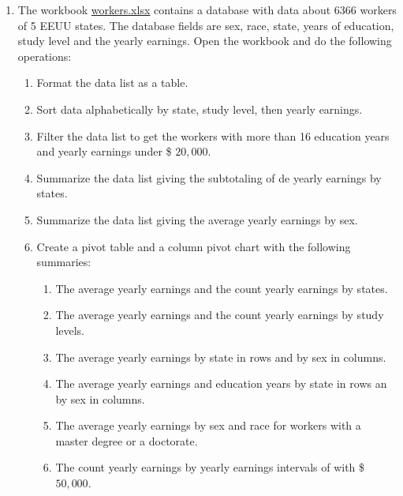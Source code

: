 \begin{enumerate}[leftmargin=*,resume]
\item The workbook
\href{http://aprendeconalf.es/office/excel/exercises/databases/workers.xlsx}{\textsf{workers.xlsx}}
contains a database with data about 6366 workers of 5 EEUU states.
The database fields are sex, race, state, years of education, study level and the yearly earnings.
Open the workbook and do the following operations:
\begin{enumerate}
\item Format the data list as a table.
\item Sort data alphabetically by state, study level, then yearly earnings.
\item Filter the data list to get the workers with more than 16 education years and yearly earnings under \$ $20,000$.   
\item Summarize the data list giving the subtotaling of de yearly earnings by states. 
\item Summarize the data list giving the average yearly earnings by sex. 
\item Create a pivot table and a column pivot chart with the following summaries: 
\begin{enumerate}
\item The average yearly earnings and the count yearly earnings by states. 
\item The average yearly earnings and the count yearly earnings by study levels.
\item The average yearly earnings by state in rows and by sex in columns.
\item The average yearly earnings and education years by state in rows an by sex in columns.
\item The average yearly earnings by sex and race for workers with a master degree or a doctorate. 
\item The count yearly earnings by yearly earnings intervals of with \$ $50,000$.
\end{enumerate}
\end{enumerate}



\end{enumerate}
